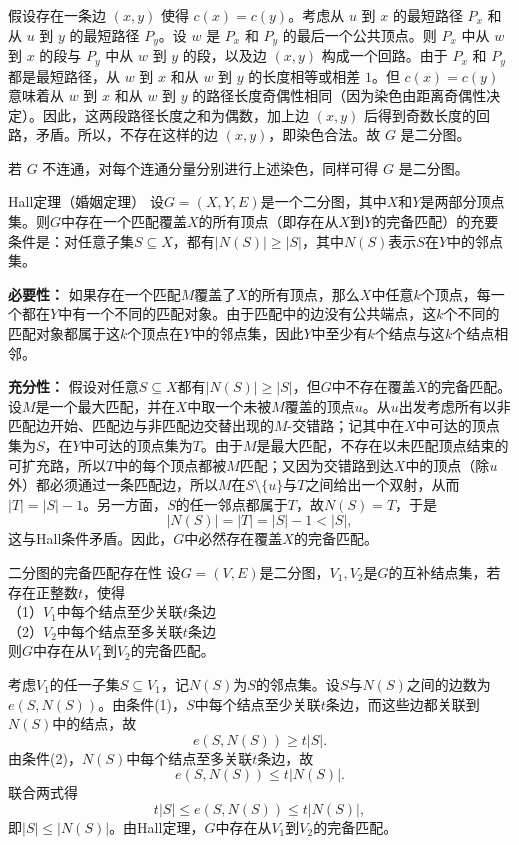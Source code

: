     假设存在一条边 $(x,y)$ 使得 $c(x)=c(y)$。考虑从 $u$ 到 $x$ 的最短路径 $P_x$ 和从 $u$ 到 $y$ 的最短路径 $P_y$。设 $w$ 是 $P_x$ 和 $P_y$ 的最后一个公共顶点。则 $P_x$ 中从 $w$ 到 $x$ 的段与 $P_y$ 中从 $w$ 到 $y$ 的段，以及边 $(x,y)$ 构成一个回路。由于 $P_x$ 和 $P_y$ 都是最短路径，从 $w$ 到 $x$ 和从 $w$ 到 $y$ 的长度相等或相差 $1$。但 $c(x)=c(y)$ 意味着从 $w$ 到 $x$ 和从 $w$ 到 $y$ 的路径长度奇偶性相同（因为染色由距离奇偶性决定）。因此，这两段路径长度之和为偶数，加上边 $(x,y)$ 后得到奇数长度的回路，矛盾。所以，不存在这样的边 $(x,y)$，即染色合法。故 $G$ 是二分图。

    若 $G$ 不连通，对每个连通分量分别进行上述染色，同样可得 $G$ 是二分图。

\begin{theorem}{Hall定理（婚姻定理）}{}
    设$G=(X,Y,E)$是一个二分图，其中$X$和$Y$是两部分顶点集。则$G$中存在一个匹配覆盖$X$的所有顶点（即存在从$X$到$Y$的完备匹配）的充要条件是：对任意子集$S\subseteq X$，都有$|N(S)|\ge |S|$，其中$N(S)$表示$S$在$Y$中的邻点集。
\end{theorem}
\textbf{必要性：} 如果存在一个匹配$M$覆盖了$X$的所有顶点，那么$X$中任意$k$个顶点，每一个都在$Y$中有一个不同的匹配对象。由于匹配中的边没有公共端点，这$k$个不同的匹配对象都属于这$k$个顶点在$Y$中的邻点集，因此$Y$中至少有$k$个结点与这$k$个结点相邻。

\textbf{充分性：} 假设对任意$S\subseteq X$都有$|N(S)|\ge |S|$，但$G$中不存在覆盖$X$的完备匹配。设$M$是一个最大匹配，并在$X$中取一个未被$M$覆盖的顶点$u$。从$u$出发考虑所有以非匹配边开始、匹配边与非匹配边交替出现的$M$-交错路；记其中在$X$中可达的顶点集为$S$，在$Y$中可达的顶点集为$T$。由于$M$是最大匹配，不存在以未匹配顶点结束的可扩充路，所以$T$中的每个顶点都被$M$匹配；又因为交错路到达$X$中的顶点（除$u$外）都必须通过一条匹配边，所以$M$在$S\setminus\{u\}$与$T$之间给出一个双射，从而$|T|=|S|-1$。另一方面，$S$的任一邻点都属于$T$，故$N(S)=T$，于是
\[
|N(S)|=|T|=|S|-1<|S|,
\]
这与Hall条件矛盾。因此，$G$中必然存在覆盖$X$的完备匹配。
\begin{theorem}{二分图的完备匹配存在性}{}
    设$G=(V,E)$是二分图，$V_1,V_2$是$G$的互补结点集，若存在正整数$t$，使得\\
    （1）$V_1$中每个结点至少关联$t$条边\\
    （2）$V_2$中每个结点至多关联$t$条边\\
    则$G$中存在从$V_1$到$V_2$的完备匹配。
\end{theorem}
考虑$V_1$的任一子集$S\subseteq V_1$，记$N(S)$为$S$的邻点集。设$S$与$N(S)$之间的边数为$e(S,N(S))$。由条件(1)，$S$中每个结点至少关联$t$条边，而这些边都关联到$N(S)$中的结点，故
    \[
    e(S,N(S)) \ge t|S|.
    \]
    由条件(2)，$N(S)$中每个结点至多关联$t$条边，故
    \[
    e(S,N(S)) \le t|N(S)|.
    \]
    联合两式得
    \[
    t|S| \le e(S,N(S)) \le t|N(S)|,
    \]
    即$|S|\le |N(S)|$。由Hall定理，$G$中存在从$V_1$到$V_2$的完备匹配。
